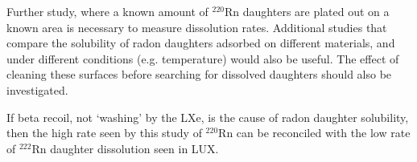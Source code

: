 Further study, where a known amount of $^{220}$Rn daughters are plated out on a known area is necessary to measure dissolution rates. Additional studies that compare the solubility of radon daughters adsorbed on different materials, and under different conditions (e.g. temperature) would also be useful. The effect of cleaning these surfaces before searching for dissolved daughters should also be investigated. 

If beta recoil, not `washing' by the \ac{LXe}, is the cause of radon daughter solubility, then the high rate seen by this study of $^{220}$Rn can be reconciled with the low rate of $^{222}$Rn daughter dissolution seen in \ac{LUX}.


